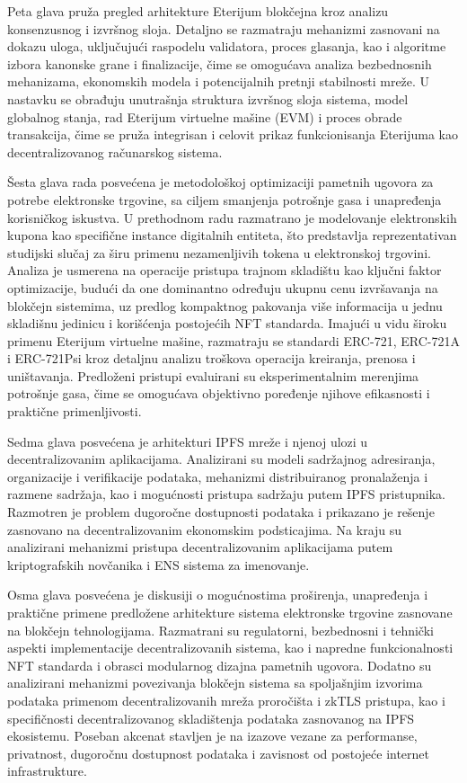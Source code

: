 Peta glava pruža pregled arhitekture Eterijum blokčejna kroz analizu konsenzusnog i izvršnog sloja. Detaljno se razmatraju mehanizmi zasnovani na dokazu uloga, uključujući raspodelu validatora, proces glasanja, kao i algoritme izbora kanonske grane i finalizacije, čime se omogućava analiza bezbednosnih mehanizama, ekonomskih modela i potencijalnih pretnji stabilnosti mreže. U nastavku se obrađuju unutrašnja struktura izvršnog sloja sistema, model globalnog stanja, rad Eterijum virtuelne mašine (EVM) i proces obrade transakcija, čime se pruža integrisan i celovit prikaz funkcionisanja Eterijuma kao decentralizovanog računarskog sistema.

Šesta glava rada posvećena je metodološkoj optimizaciji pametnih ugovora za potrebe elektronske trgovine, sa ciljem smanjenja potrošnje gasa i unapređenja korisničkog iskustva. U prethodnom radu razmatrano je modelovanje elektronskih kupona kao specifične instance digitalnih entiteta, što predstavlja reprezentativan studijski slučaj za širu primenu nezamenljivih tokena u elektronskoj trgovini. Analiza je usmerena na operacije pristupa trajnom skladištu kao ključni faktor optimizacije, budući da one dominantno određuju ukupnu cenu izvršavanja na blokčejn sistemima, uz predlog kompaktnog pakovanja više informacija u jednu skladišnu jedinicu i korišćenja postojećih NFT standarda. Imajući u vidu široku primenu Eterijum virtuelne mašine, razmatraju se standardi ERC-721, ERC-721A i ERC-721Psi kroz detaljnu analizu troškova operacija kreiranja, prenosa i uništavanja. Predloženi pristupi evaluirani su eksperimentalnim merenjima potrošnje gasa, čime se omogućava objektivno poređenje njihove efikasnosti i praktične primenljivosti.

Sedma glava posvećena je arhitekturi IPFS mreže i njenoj ulozi u decentralizovanim aplikacijama. Analizirani su modeli sadržajnog adresiranja, organizacije i verifikacije podataka, mehanizmi distribuiranog pronalaženja i razmene sadržaja, kao i mogućnosti pristupa sadržaju putem IPFS pristupnika. Razmotren je problem dugoročne dostupnosti podataka i prikazano je rešenje zasnovano na decentralizovanim ekonomskim podsticajima. Na kraju su analizirani mehanizmi pristupa decentralizovanim aplikacijama putem kriptografskih novčanika i ENS sistema za imenovanje.

Osma glava posvećena je diskusiji o mogućnostima proširenja, unapređenja i praktične primene predložene arhitekture sistema elektronske trgovine zasnovane na blokčejn tehnologijama. Razmatrani su regulatorni, bezbednosni i tehnički aspekti implementacije decentralizovanih sistema, kao i napredne funkcionalnosti NFT standarda i obrasci modularnog dizajna pametnih ugovora. Dodatno su analizirani mehanizmi povezivanja blokčejn sistema sa spoljašnjim izvorima podataka primenom decentralizovanih mreža proročišta i zkTLS pristupa, kao i specifičnosti decentralizovanog skladištenja podataka zasnovanog na IPFS ekosistemu. Poseban akcenat stavljen je na izazove vezane za performanse, privatnost, dugoročnu dostupnost podataka i zavisnost od postojeće internet infrastrukture.

